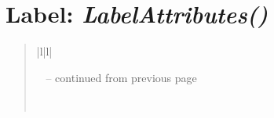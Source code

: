 \documentclass[letterpaper,10pt,english]{sphinxmanual}
\begin{document}
\begin{DUlineblock}{0em}
\item[] 
\end{DUlineblock}

\begin{DUlineblock}{0em}
\item[] 
\end{DUlineblock}


\section{\textbf{Label}: \emph{LabelAttributes()}}
\label{attributes:label-labelattributes}
\begin{DUlineblock}{0em}
\item[] 
\end{DUlineblock}
\begin{quote}

\begin{longtable}{|l|l|}
\hline
\endfirsthead

%
{{\textsf{\tablename\ \thetable{} -- continued from previous page}}} \\
\hline
\endhead

\hline {} \\ \hline
\endfoot

\endlastfoot



\end{longtable}
\end{quote}
\end{document}

